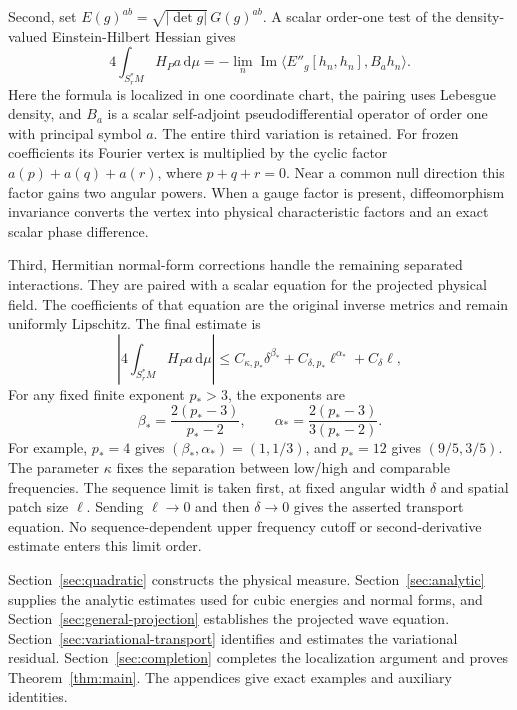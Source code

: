 \documentclass[11pt,a4paper]{article}
\numberwithin{equation}{section}
\newcommand{\dd}{\mathrm d}
\newcommand{\ip}[2]{\langle #1,#2\rangle}
\newcommand{\f}[2]{\frac{#1}{#2}}
\renewcommand{\Im}{\operatorname{Im}}
\theoremstyle{definition}
\begin{document}
Second, set $E(g)^{ab}=\sqrt{|\det g|}\,G(g)^{ab}$.
A scalar order-one test of the density-valued Einstein-Hilbert Hessian gives
\begin{equation*}
4\int_{S_r^*M}H_Pa\,\dd\mu
=-\lim_n\Im
\ip{E''_g[h_n,h_n]}{B_ah_n}.
\end{equation*}
Here the formula is localized in one coordinate chart, the pairing uses
Lebesgue density, and $B_a$ is a scalar self-adjoint pseudodifferential
operator of order one with principal symbol $a$.
The entire third variation is retained. For frozen coefficients its
Fourier vertex is multiplied by the cyclic factor
$a(p)+a(q)+a(r)$, where $p+q+r=0$. Near a common null direction this
factor gains two angular powers. When a gauge factor is present,
diffeomorphism invariance converts the vertex into physical characteristic
factors and an exact scalar phase difference.

Third, Hermitian normal-form corrections handle the remaining separated
interactions. They are paired with a scalar equation for the projected
physical field. The coefficients of that equation are the original
inverse metrics and remain uniformly Lipschitz. The final estimate is
\begin{equation*}
\left|4\int_{S_r^*M}H_Pa\,\dd\mu\right|
\leq C_{\kappa,p_*}\delta^{\beta_*}
 +C_{\delta,p_*}\ell^{\alpha_*}+C_\delta\ell,
\end{equation*}
For any fixed finite exponent $p_*>3$, the exponents are
\begin{equation}\label{eq:optimized-exponents}
\beta_* = \f{2(p_*-3)}{p_*-2},\qquad
\alpha_* = \f{2(p_*-3)}{3(p_*-2)}.
\end{equation}
For example, $p_*=4$ gives $(\beta_*,\alpha_*)=(1,1/3)$,
and $p_*=12$ gives $(9/5,3/5)$.
The parameter $\kappa$ fixes the separation between low/high and comparable
frequencies. The sequence limit is taken first, at fixed angular width
$\delta$ and spatial patch size $\ell$. Sending $\ell\to0$ and then $\delta\to0$
gives the asserted transport equation. No sequence-dependent upper
frequency cutoff or second-derivative estimate enters this limit order.

Section~\ref{sec:quadratic} constructs the physical measure.
Section~\ref{sec:analytic} supplies the analytic estimates used for
cubic energies and normal forms, and Section~\ref{sec:general-projection}
establishes the projected wave equation.
Section~\ref{sec:variational-transport} identifies and estimates the
variational residual. Section~\ref{sec:completion} completes the
localization argument and proves Theorem~\ref{thm:main}.
The appendices give exact examples and auxiliary identities.
\end{document}
